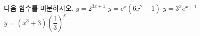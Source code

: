 다음 함수를 미분하시오.
 $y=2^{3x+1}$
 $y=e^x(6x^2-1)$
 $y=3^xe^{x+1}$
 $y=(x^3+3)\left(\dfrac{1}{3}\right)^x$
